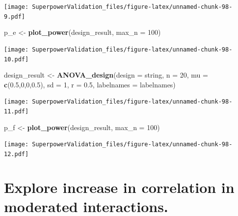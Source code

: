 \documentclass[]{book}
\newenvironment{Shaded}{\begin{snugshade}}{\end{snugshade}}
\newcommand{\DataTypeTok}[1]{\textcolor[rgb]{0.13,0.29,0.53}{#1}}
\newcommand{\DecValTok}[1]{\textcolor[rgb]{0.00,0.00,0.81}{#1}}
\newcommand{\FloatTok}[1]{\textcolor[rgb]{0.00,0.00,0.81}{#1}}
\newcommand{\KeywordTok}[1]{\textcolor[rgb]{0.13,0.29,0.53}{\textbf{#1}}}
\newcommand{\NormalTok}[1]{#1}
\newcommand{\StringTok}[1]{\textcolor[rgb]{0.31,0.60,0.02}{#1}}
\begin{document}
\texttt{[image: SuperpowerValidation\_files/figure-latex/unnamed-chunk-98-9.pdf]}

\begin{Shaded}
\begin{Highlighting}[]
\NormalTok{p_e <-}\StringTok{ }\KeywordTok{plot_power}\NormalTok{(design_result,}
                      \DataTypeTok{max_n =} \DecValTok{100}\NormalTok{)}
\end{Highlighting}
\end{Shaded}

\texttt{[image: SuperpowerValidation\_files/figure-latex/unnamed-chunk-98-10.pdf]}

\begin{Shaded}
\begin{Highlighting}[]
\NormalTok{design_result <-}\StringTok{ }\KeywordTok{ANOVA_design}\NormalTok{(}\DataTypeTok{design =}\NormalTok{ string,}
                              \DataTypeTok{n =} \DecValTok{20}\NormalTok{, }
                              \DataTypeTok{mu =} \KeywordTok{c}\NormalTok{(}\FloatTok{0.5}\NormalTok{,}\DecValTok{0}\NormalTok{,}\DecValTok{0}\NormalTok{,}\FloatTok{0.5}\NormalTok{), }
                              \DataTypeTok{sd =} \DecValTok{1}\NormalTok{, }
                              \DataTypeTok{r =} \FloatTok{0.5}\NormalTok{, }
                              \DataTypeTok{labelnames =}\NormalTok{ labelnames)}
\end{Highlighting}
\end{Shaded}

\texttt{[image: SuperpowerValidation\_files/figure-latex/unnamed-chunk-98-11.pdf]}

\begin{Shaded}
\begin{Highlighting}[]
\NormalTok{p_f <-}\StringTok{ }\KeywordTok{plot_power}\NormalTok{(design_result,}
                      \DataTypeTok{max_n =} \DecValTok{100}\NormalTok{)}
\end{Highlighting}
\end{Shaded}

\texttt{[image: SuperpowerValidation\_files/figure-latex/unnamed-chunk-98-12.pdf]}

\hypertarget{explore-increase-in-correlation-in-moderated-interactions.}{%
\section{Explore increase in correlation in moderated interactions.}\label{explore-increase-in-correlation-in-moderated-interactions.}}
\end{document}
